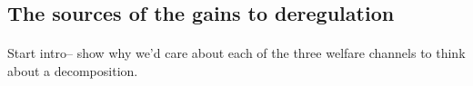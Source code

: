 \subsection{The sources of the gains to deregulation}
\paragraph*{}
Start intro-- show why we'd care about each of the three welfare channels to think about a decomposition. 





